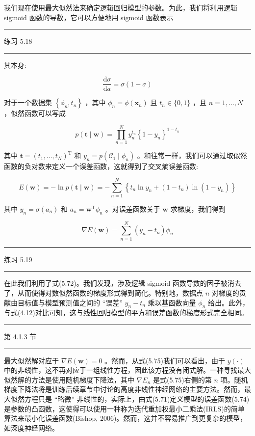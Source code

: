 \documentclass[10pt]{report}
\newcommand{\HRule}{\begin{center}\rule{0.9\linewidth}{0.2mm}\end{center}}
\begin{document}
我们现在使用最大似然法来确定逻辑回归模型的参数。为此，我们将利用逻辑 sigmoid 函数的导数，它可以方便地用 sigmoid 函数表示

\HRule

练习 5.18

\HRule

其本身:

\[
\frac{\mathrm{d}\sigma }{\mathrm{d}a} = \sigma \left( {1 - \sigma }\right)  \tag{5.72}
\]

对于一个数据集 \(\left\{  {{\phi }_{n},{t}_{n}}\right\}\) ，其中 \({\phi }_{n} = \phi \left( {\mathbf{x}}_{n}\right)\) 且 \({t}_{n} \in  \{ 0,1\}\) ，且 \(n = 1,\ldots ,N\) ，似然函数可以写成

\[
p\left( {\mathbf{t} \mid  \mathbf{w}}\right)  = \mathop{\prod }\limits_{{n = 1}}^{N}{y}_{n}^{{t}_{n}}{\left\{  1 - {y}_{n}\right\}  }^{1 - {t}_{n}} \tag{5.73}
\]

其中 \(\mathbf{t} = {\left( {t}_{1},\ldots ,{t}_{N}\right) }^{\mathrm{T}}\) 和 \({y}_{n} = p\left( {{\mathcal{C}}_{1} \mid  {\phi }_{n}}\right)\) 。和往常一样，我们可以通过取似然函数的负对数来定义一个误差函数，这就得到了交叉熵误差函数:

\[
E\left( \mathbf{w}\right)  =  - \ln p\left( {\mathbf{t} \mid  \mathbf{w}}\right)  =  - \mathop{\sum }\limits_{{n = 1}}^{N}\left\{  {{t}_{n}\ln {y}_{n} + \left( {1 - {t}_{n}}\right) \ln \left( {1 - {y}_{n}}\right) }\right\}   \tag{5.74}
\]

其中 \({y}_{n} = \sigma \left( {a}_{n}\right)\) 和 \({a}_{n} = {\mathbf{w}}^{\mathrm{T}}{\phi }_{n}\) 。对误差函数关于 \(\mathbf{w}\) 求梯度，我们得到

\[
\nabla E\left( \mathbf{w}\right)  = \mathop{\sum }\limits_{{n = 1}}^{N}\left( {{y}_{n} - {t}_{n}}\right) {\phi }_{n} \tag{5.75}
\]

\HRule

练习 5.19

\HRule

在此我们利用了式(5.72)。我们发现，涉及逻辑 sigmoid 函数导数的因子被消去了，从而使得对数似然函数的梯度形式得到简化。特别地，数据点 \(n\) 对梯度的贡献由目标值与模型预测值之间的 “误差” \({y}_{n} - {t}_{n}\) 乘以基函数向量 \({\phi }_{n}\) 给出。此外，与式(4.12)对比可知，这与线性回归模型的平方和误差函数的梯度形式完全相同。

\HRule

第 4.1.3 节

\HRule

最大似然解对应于 \(\nabla E\left( \mathbf{w}\right)  = 0\) 。然而，从式(5.75)我们可以看出，由于 \(y\left( \cdot \right)\) 中的非线性，这不再对应于一组线性方程，因此该方程没有闭式解。一种寻找最大似然解的方法是使用随机梯度下降法，其中 \(\nabla {E}_{n}\) 是式(5.75)右侧的第 \(n\) 项。随机梯度下降法将是训练后续章节中讨论的高度非线性神经网络的主要方法。然而，最大似然方程只是 “略微” 非线性的，实际上，由式(5.71)定义模型的误差函数(5.74)是参数的凸函数，这使得可以使用一种称为迭代重加权最小二乘法(IRLS)的简单算法来最小化误差函数(Bishop, 2006)。然而，这并不容易推广到更复杂的模型，如深度神经网络。
\end{document}
